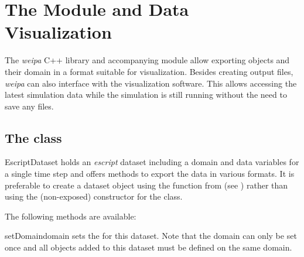 
%
%
%

\chapter{The \weipa Module and Data Visualization}\label{chap:weipa}

The {\it weipa} C++ library and accompanying \PYTHON module allow exporting
\escript \Data objects and their domain in a format suitable for visualization.
Besides creating output files, {\it weipa} can also interface with the \VisIt
visualization software. This allows accessing the latest simulation data while
the simulation is still running without the need to save any files.

\section{The  class}
\begin{classdesc}{EscriptDataset}{}
    holds an {\it escript} dataset including a domain and data variables
    for a single time step and offers methods to export the data in various
    formats.
    It is preferable to create a dataset object using the 
    function from \weipa (see ) rather than using the (non-exposed)
    \PYTHON constructor for the class.
\end{classdesc}

\noindent The following methods are available:
\begin{methoddesc}[EscriptDataset]{setDomain}{domain}
    sets the \Domain for this dataset. Note that the domain can only be set
    once and all \Data objects added to this dataset must be defined on the
    same domain.
\end{methoddesc}

